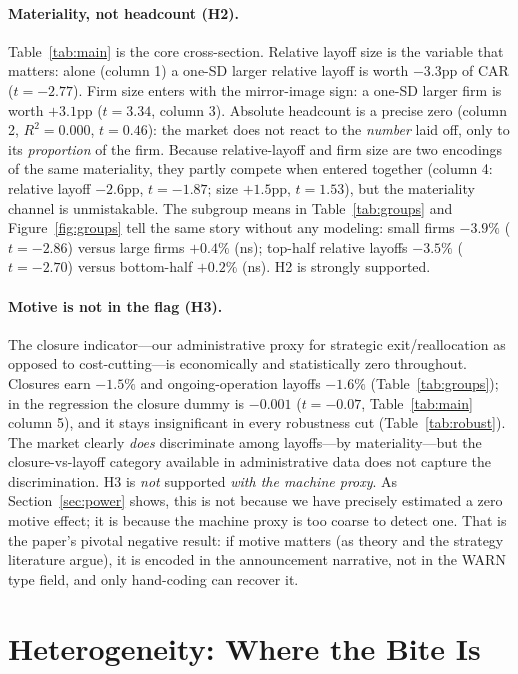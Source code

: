 \documentclass[12pt]{article}
\begin{document}
\paragraph{Materiality, not headcount (H2).} Table~\ref{tab:main} is the core
cross-section. Relative layoff size is the variable that matters: alone (column 1)
a one-SD larger relative layoff is worth $-3.3$pp of CAR ($t=-2.77$). Firm size
enters with the mirror-image sign: a one-SD larger firm is worth $+3.1$pp
($t=3.34$, column 3). Absolute headcount is a precise zero (column 2, $R^2=0.000$,
$t=0.46$): the market does not react to the \emph{number} laid off, only to its
\emph{proportion} of the firm. Because relative-layoff and firm size are two
encodings of the same materiality, they partly compete when entered together
(column 4: relative layoff $-2.6$pp, $t=-1.87$; size $+1.5$pp, $t=1.53$), but the
materiality channel is unmistakable. The subgroup means in Table~\ref{tab:groups}
and Figure~\ref{fig:groups} tell the same story without any modeling: small firms
$-3.9\%$ ($t=-2.86$) versus large firms $+0.4\%$ (ns); top-half relative layoffs
$-3.5\%$ ($t=-2.70$) versus bottom-half $+0.2\%$ (ns). H2 is strongly supported.

\paragraph{Motive is not in the flag (H3).} The closure indicator---our
administrative proxy for strategic exit/reallocation as opposed to
cost-cutting---is economically and statistically zero throughout. Closures earn
$-1.5\%$ and ongoing-operation layoffs $-1.6\%$ (Table~\ref{tab:groups}); in the
regression the closure dummy is $-0.001$ ($t=-0.07$, Table~\ref{tab:main} column
5), and it stays insignificant in every robustness cut (Table~\ref{tab:robust}).
The market clearly \emph{does} discriminate among layoffs---by materiality---but
the closure-vs-layoff category available in administrative data does not capture
the discrimination. H3 is \emph{not} supported \emph{with the machine proxy}. As
Section~\ref{sec:power} shows, this is not because we have precisely estimated a
zero motive effect; it is because the machine proxy is too coarse to detect one.
That is the paper's pivotal negative result: if motive matters (as theory and the
strategy literature argue), it is encoded in the announcement narrative, not in
the WARN type field, and only hand-coding can recover it.

\section{Heterogeneity: Where the Bite Is}\label{sec:het}
\end{document}
